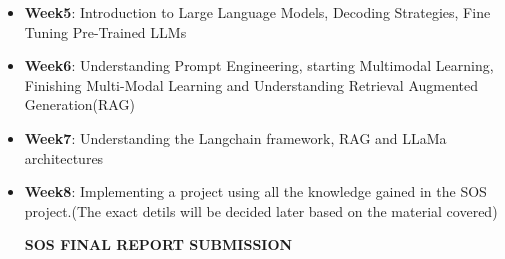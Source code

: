\documentclass{article}
\begin{document}
\begin{itemize}
    \Large
    \item \textbf{\Large Week5}: Introduction to Large Language Models, Decoding Strategies, Fine Tuning Pre-Trained LLMs
    \vspace{0.3cm}
    \item \textbf{\Large Week6}: Understanding Prompt Engineering, starting Multimodal Learning, Finishing Multi-Modal Learning and Understanding Retrieval Augmented Generation(RAG)
    \vspace{0.3cm}
    \item \textbf{\Large Week7}: Understanding the Langchain framework, RAG and LLaMa architectures
    \vspace{0.3cm}
    \item \textbf{\Large Week8}: Implementing a project using all the knowledge gained in the SOS project.(The exact detils will be decided later based on the material covered)
    \vspace{0.4cm}
    
    \begin{center}
        \textbf{\Large SOS FINAL REPORT SUBMISSION}
    \end{center}
\end{itemize}
\end{document}
